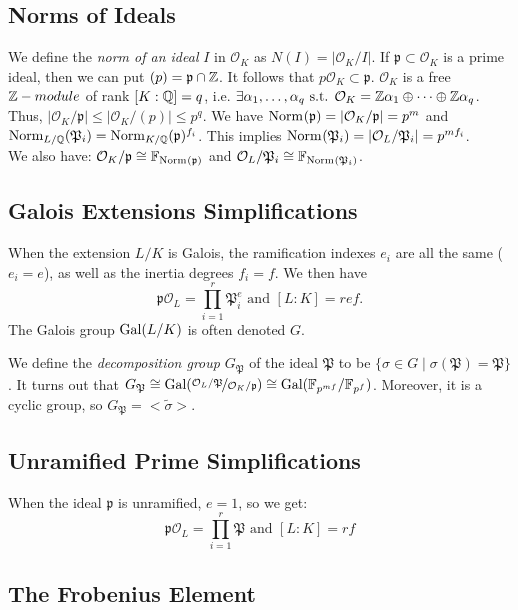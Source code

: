 \subsection{Norms of Ideals}
We define the \textit{norm of an ideal} $I$ in $\mathcal{O}_K$ as $N(I)=|\mathcal{O}_K/I|$.
If $\mathfrak{p} \subset \mathcal{O}_K$ is a prime ideal, then we can put $(p)=\mathfrak{p} \cap \Z$.
It follows that $p\mathcal{O}_K \subset \mathfrak{p}$.
$\mathcal{O}_K$ is a free $\Z-module$ of rank $[K:\Q]=q$, i.e. $\exists \alpha_1,\dots,\alpha_q \text{ s.t. } \mathcal{O}_K=\Z \alpha_1 \oplus \cdots \oplus \Z \alpha_q$.
Thus, $|\mathcal{O}_K/\mathfrak{p}| \leq |\mathcal{O}_K/(p)| \leq p^q$.
We have $\Norm{\mathfrak{p}} = |\mathcal{O}_K/\mathfrak{p}|=p^m$ and $\Norm[L/\Q]{\mathfrak{P}_i} = \Norm[K/\Q]{\mathfrak{p}}^{f_i}$.
This implies $\Norm{\mathfrak{P}_i} = |\mathcal{O}_L/\mathfrak{P}_i| = p^{mf_i}$.\\
We also have: 
$\mathcal{O}_K/\mathfrak{p} \cong \mathbb{F}_{\Norm{\mathfrak{p}}}$ and $\mathcal{O}_L/\mathfrak{P}_i \cong \mathbb{F}_{\Norm{\mathfrak{P}_i}}$.

\subsection{Galois Extensions Simplifications}
When the extension $L/K$ is Galois, the ramification indexes $e_i$ are all the same ($e_i=e$), as well as the inertia degrees $f_i=f$.
We then have
$$
\mathfrak{p}\mathcal{O}_L = \prod_{i=1}^r \mathfrak{P}_i^{e}
\text{ and } [L:K] = ref.
$$
The Galois group $\Gal{L/K}$ is often denoted $G$.

We define the \textit{decomposition group} $G_{\mathfrak{P}}$ of the ideal $\mathfrak{P}$ to be $\{\sigma \in G \mid \sigma(\mathfrak{P})=\mathfrak{P} \}$.
It turns out that 
$G_{\mathfrak{P}} 
\cong \Gal{\nicefrac{\mathcal{O}_L/\mathfrak{P}}{\mathcal{O}_K/\mathfrak{p}}}
\cong \Gal{ \mathbb{F}_{p^{mf}}/\mathbb{F}_{p^{f}}}$.
Moreover, it is a cyclic group, so $G_{\mathfrak{P}} = <\tilde{\sigma}>$.

\subsection{Unramified Prime Simplifications}
When the ideal $\mathfrak{p}$ is unramified, $e=1$, so we get:
$$
\mathfrak{p}\mathcal{O}_L 
= \prod_{i=1}^r \mathfrak{P} \text{ and } [L:K] = rf
$$

\subsection{The Frobenius Element}

